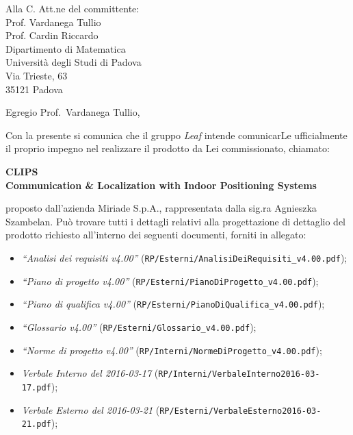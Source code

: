 \documentclass[a4paper,12pt]{letteracdp}
\author{Oscar Elia Conti}
\date{11 aprile 2016}
\begin{document}
	\begin{letter}{
		Alla C. Att.ne del committente: \\
		Prof. Vardanega Tullio \\
		Prof. Cardin Riccardo \\
		Dipartimento di Matematica \\
		Università degli Studi di Padova \\
		Via Trieste, 63 \\
		35121 Padova}
		
		\opening{Egregio Prof.~Vardanega Tullio,}
		Con la presente si comunica che il gruppo \textit{Leaf} intende comunicarLe ufficialmente il proprio impegno nel realizzare il prodotto da Lei commissionato, chiamato:
\begin{center}
	\textbf{CLIPS \\ Communication \& Localization with Indoor Positioning Systems}
\end{center}
proposto dall'azienda Miriade S.p.A., rappresentata dalla sig.ra Agnieszka Szambelan.
Può trovare tutti i dettagli relativi alla progettazione di dettaglio del prodotto richiesto all'interno dei seguenti documenti, forniti in allegato:

\begin{itemize}
	\item \textit{“Analisi dei requisiti v4.00”} (\texttt{RP/Esterni/AnalisiDeiRequisiti\_v4.00.pdf});

	\item \textit{“Piano di progetto v4.00”} (\texttt{RP/Esterni/PianoDiProgetto\_v4.00.pdf});

	\item \textit{“Piano di qualifica v4.00”} (\texttt{RP/Esterni/PianoDiQualifica\_v4.00.pdf});
	
	\item \textit{“Glossario v4.00”} (\texttt{RP/Esterni/Glossario\_v4.00.pdf});
	
	\item \textit{“Norme di progetto v4.00”} (\texttt{RP/Interni/NormeDiProgetto\_v4.00.pdf});

	\item \textit{Verbale Interno del 2016-03-17}	(\texttt{RP/Interni/VerbaleInterno2016-03-17.pdf});
	
	\item \textit{Verbale Esterno del 2016-03-21}	(\texttt{RP/Esterni/VerbaleEsterno2016-03-21.pdf});
		
\end{itemize}


\end{letter}
\end{document}
